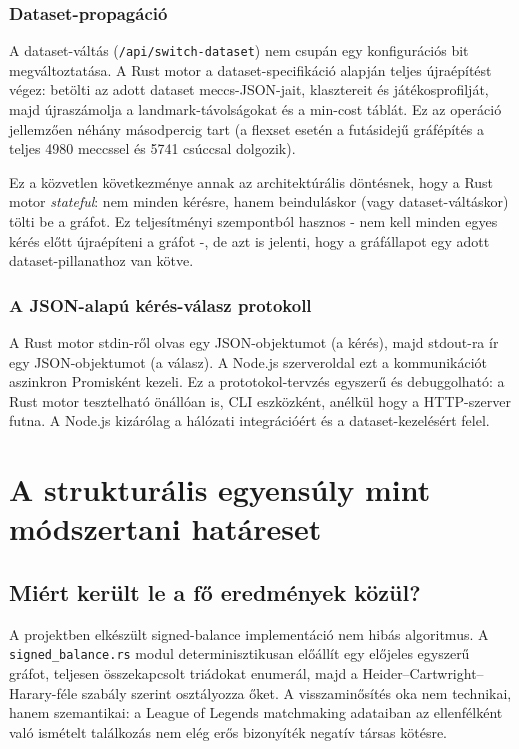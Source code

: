 ﻿\documentclass[a4paper,12pt]{report}
\begin{document}
\subsection{Dataset-propagáció}

A dataset-váltás (\texttt{/api/switch-dataset}) nem csupán egy konfigurációs bit megváltoztatása. A Rust motor a dataset-specifikáció alapján teljes újraépítést végez: betölti az adott dataset meccs-JSON-jait, klasztereit és játékosprofilját, majd újraszámolja a landmark-távolságokat és a min-cost táblát. Ez az operáció jellemzően néhány másodpercig tart (a flexset esetén a futásidejű gráfépítés a teljes 4980 meccssel és 5741 csúccsal dolgozik).

Ez a közvetlen következménye annak az architektúrális döntésnek, hogy a Rust motor \emph{stateful}: nem minden kérésre, hanem beinduláskor (vagy dataset-váltáskor) tölti be a gráfot. Ez teljesítményi szempontból hasznos - nem kell minden egyes kérés előtt újraépíteni a gráfot -, de azt is jelenti, hogy a gráfállapot egy adott dataset-pillanathoz van kötve.

\subsection{A JSON-alapú kérés-válasz protokoll}

A Rust motor stdin-ről olvas egy JSON-objektumot (a kérés), majd stdout-ra ír egy JSON-objektumot (a válasz). A Node.js szerveroldal ezt a kommunikációt aszinkron Promisként kezeli. Ez a prototokol-tervzés egyszerű és debuggolható: a Rust motor tesztelható önállóan is, CLI eszközként, anélkül hogy a HTTP-szerver futna. A Node.js kizárólag a hálózati integrációért és a dataset-kezelésért felel.

\chapter{A strukturális egyensúly mint módszertani határeset}

\section{Miért került le a fő eredmények közül?}

A projektben elkészült signed-balance implementáció nem hibás algoritmus. A \texttt{signed\_balance.rs} modul determinisztikusan előállít egy előjeles egyszerű gráfot, teljesen összekapcsolt triádokat enumerál, majd a Heider--Cartwright--Harary-féle szabály szerint osztályozza őket. A visszaminősítés oka nem technikai, hanem szemantikai: a League of Legends matchmaking adataiban az ellenfélként való ismételt találkozás nem elég erős bizonyíték negatív társas kötésre.
\end{document}
